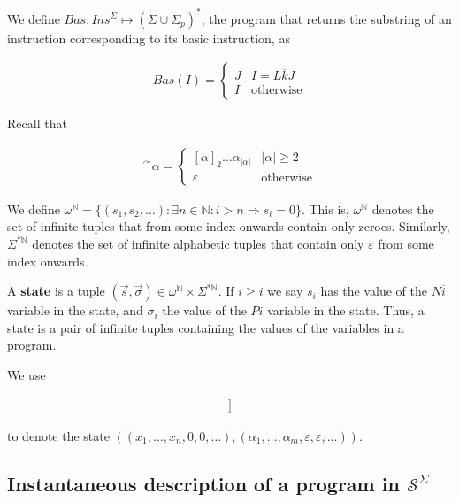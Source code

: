 \documentclass[a4paper, 12pt]{article}
\begin{document}
We define $Bas : Ins^{\Sigma} \mapsto (\Sigma \cup \Sigma_p)^{*}$, the program
that returns the substring of an instruction corresponding to its basic
instruction, as 

\begin{align*}
    Bas(I) = \begin{cases}
        J & I = L \overline{k} J \\ 
        I & \text{otherwise}
    \end{cases}
\end{align*}

Recall that 

\begin{align*}
    {}^{\curvearrowright} \alpha = \begin{cases}
        [\alpha]_2 \ldots \alpha_|\alpha| & |\alpha| \geq 2 \\ 
        \varepsilon & \text{otherwise}
    \end{cases}
\end{align*}

We define $\omega^{\mathbb{N}} = \{ (s_1, s_2, \ldots) : \exists n \in
\mathbb{N} : i > n \Rightarrow s_i = 0 \}$. This is, $\omega^{\mathbb{N}}$
denotes the set of infinite tuples that from some index onwards contain only
zeroes. Similarly, $\Sigma^{*\mathbb{N}}$ denotes the set of infinite alphabetic
tuples that contain only $\varepsilon$ from some index onwards.

A \textbf{state} is a tuple $(\overrightarrow{s}, \overrightarrow{\sigma}) \in
\omega^{\mathbb{N}} \times \Sigma^{*\mathbb{N}}$. If $i \geq i$ we say $s_i$ has
the value of the ${N} \overline{i}$ variable in the state, and $\sigma_i$ the
value of the $P \overline{i}$ variable in the state. Thus, a state is a pair of
infinite tuples containing the values of the variables in a program.

We use 

\begin{align*}
    [\![ x_1, \ldots x_n, ~ \alpha_1, \ldots, \alpha_m ]\!]
\end{align*}

to denote the state $\left( (x_1, \ldots, x_n, 0, 0, \ldots), (\alpha_1, \ldots,
\alpha_m, \varepsilon, \varepsilon,\ldots) \right) $.

\subsection{Instantaneous description of a program in $\mathcal{S}^{\Sigma}$}
\end{document}
